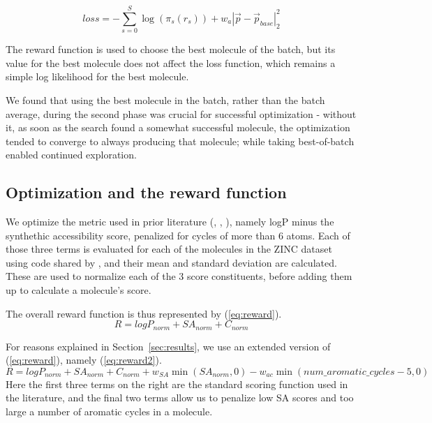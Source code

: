 \documentclass[11pt]{article}
\begin{document}
\begin{equation}\label{eq:pgloss_anchor}
loss =- \sum_{s=0}^S \log\left(\pi_s\left(r_s\right)\right) + w_a\left| \vec p - \vec p_{base} \right|_2^2
\end{equation}

The reward function is used to choose the best molecule of the batch, but its value for the best molecule does not affect the loss function, which remains a simple log likelihood for the best molecule.

We found that using the best molecule in the batch, rather than the batch average, during the second phase was crucial for successful optimization - without it, as soon as the search found a somewhat successful molecule, the optimization tended to converge to always producing that molecule; while taking best-of-batch enabled continued exploration.

\subsection{Optimization and the reward function}\label{sec:reward}
We optimize the metric used in prior literature (\cite{Gomez-Bombarelli16}, \cite{kusner17}, \cite{jin18}), namely logP minus the synthethic accessibility score, penalized for cycles of more than 6 atoms. Each of those three terms is evaluated for each of the molecules in the ZINC dataset using code shared by \cite{kusner17}, and their mean and standard deviation are calculated. These are used to normalize each of the 3 score constituents, before adding them up to calculate a molecule's score.

The overall reward function is thus represented by (\ref{eq:reward}). 
\begin{equation}\label{eq:reward}
R = logP_{norm} + SA_{norm} + C_{norm}
\end{equation}

For reasons explained in Section~\ref{sec:results}, we use an extended version of (\ref{eq:reward}), namely (\ref{eq:reward2}).
\begin{equation}\label{eq:reward2}
R = logP_{norm} + SA_{norm} + C_{norm} + w_{SA} \min\left( SA_{norm}, 0\right) - w_{ac} \min\left( num\_aromatic\_cycles -5, 0\right)
\end{equation}
Here the first three terms on the right are the standard scoring function used in the literature, and the final two terms allow us to penalize low SA scores and too large a number of aromatic cycles in a molecule.
\end{document}
